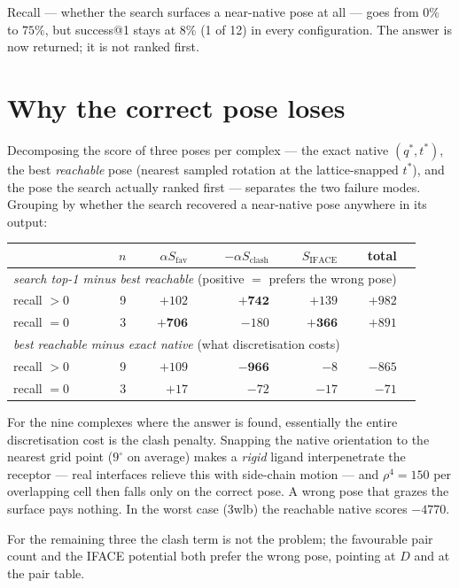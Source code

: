 \documentclass[11pt,a4paper]{article}
\begin{document}
Recall --- whether the search surfaces a near-native pose at all --- goes from
$0\%$ to $75\%$, but success@1 stays at $8\%$ (1 of 12) in every configuration.
The answer is now returned; it is not ranked first.

\section{Why the correct pose loses}

Decomposing the score of three poses per complex --- the exact native
$(q^\ast, t^\ast)$, the best \emph{reachable} pose (nearest sampled rotation at
the lattice-snapped $t^\ast$), and the pose the search actually ranked first ---
separates the two failure modes. Grouping by whether the search recovered a
near-native pose anywhere in its output:

\begin{center}
\begin{tabular}{lrrrrrr}
  \toprule
  & $n$ & $\alpha S_{\text{fav}}$ & $-\alpha S_{\text{clash}}$ & $S_{\text{IFACE}}$ & total \\
  \midrule
  \multicolumn{6}{l}{\emph{search top-1 minus best reachable} (positive $=$ prefers the wrong pose)}\\
  recall $>0$ & 9 & $+102$ & $\mathbf{+742}$ & $+139$ & $+982$ \\
  recall $=0$ & 3 & $\mathbf{+706}$ & $-180$ & $\mathbf{+366}$ & $+891$ \\
  \midrule
  \multicolumn{6}{l}{\emph{best reachable minus exact native} (what discretisation costs)}\\
  recall $>0$ & 9 & $+109$ & $\mathbf{-966}$ & $-8$ & $-865$ \\
  recall $=0$ & 3 & $+17$  & $-72$  & $-17$ & $-71$ \\
  \bottomrule
\end{tabular}
\end{center}

For the nine complexes where the answer is found, essentially the entire
discretisation cost is the clash penalty. Snapping the native orientation to the
nearest grid point ($9^\circ$ on average) makes a \emph{rigid} ligand
interpenetrate the receptor --- real interfaces relieve this with side-chain
motion --- and $\rho^4 = 150$ per overlapping cell then falls only on the correct
pose. A wrong pose that grazes the surface pays nothing. In the worst case
(3wlb) the reachable native scores $-4770$.

For the remaining three the clash term is not the problem; the favourable pair
count and the IFACE potential both prefer the wrong pose, pointing at $D$ and at
the pair table.
\end{document}
